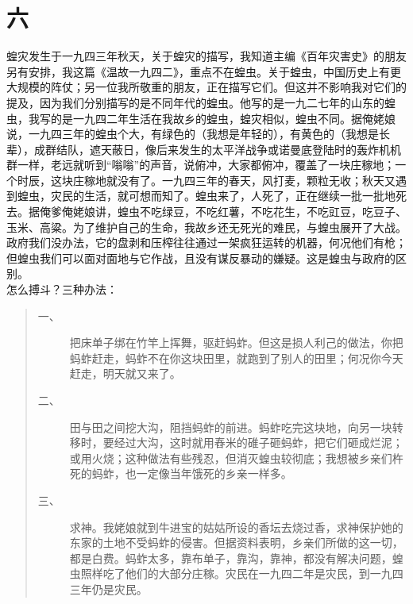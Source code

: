 \fancyhead[RO]{\thepage} %
\fancyhead[LE]{\thepage} %
\fancyfoot[LE,RO]{}
\fancyfoot[LO,CE]{}
\fancyfoot[CO,RE]{}
\chapter*{六}
蝗灾发生于一九四三年秋天，关于蝗灾的描写，我知道主编《百年灾害史》的朋友另有安排，我这篇《温故一九四二》，重点不在蝗虫。关于蝗虫，中国历史上有更大规模的阵仗；另一位我所敬重的朋友，正在描写它们。但这并不影响我对它们的提及，因为我们分别描写的是不同年代的蝗虫。他写的是一九二七年的山东的蝗虫，我写的是一九四二年生活在我故乡的蝗虫，蝗灾相似，蝗虫不同。据俺姥娘说，一九四三年的蝗虫个大，有绿色的（我想是年轻的），有黄色的（我想是长辈），成群结队，遮天蔽日，像后来发生的太平洋战争或诺曼底登陆时的轰炸机机群一样，老远就听到“嗡嗡”的声音，说俯冲，大家都俯冲，覆盖了一块庄稼地；一个时辰，这块庄稼地就没有了。一九四三年的春天，风打麦，颗粒无收；秋天又遇到蝗虫，灾民的生活，就可想而知了。蝗虫来了，人死了，正在继续一批一批地死去。据俺爹俺姥娘讲，蝗虫不吃绿豆，不吃红薯，不吃花生，不吃豇豆，吃豆子、玉米、高粱。为了维护自己的生命，我故乡还无死光的难民，与蝗虫展开了大战。政府我们没办法，它的盘剥和压榨往往通过一架疯狂运转的机器，何况他们有枪；但蝗虫我们可以面对面地与它作战，且没有谋反暴动的嫌疑。这是蝗虫与政府的区别。\\

怎么搏斗？三种办法：\\

\begin{quote}
		\begin{description}
	
		\item [一、] 把床单子绑在竹竿上挥舞，驱赶蚂蚱。但这是损人利己的做法，你把蚂蚱赶走，蚂蚱不在你这块田里，就跑到了别人的田里；何况你今天赶走，明天就又来了。\\
		
		\item [二、] 田与田之间挖大沟，阻挡蚂蚱的前进。蚂蚱吃完这块地，向另一块转移时，要经过大沟，这时就用舂米的碓子砸蚂蚱，把它们砸成烂泥；或用火烧；这种做法有些残忍，但消灭蝗虫较彻底；我想被乡亲们杵死的蚂蚱，也一定像当年饿死的乡亲一样多。\\
		
		\item [三、] 求神。我姥娘就到牛进宝的姑姑所设的香坛去烧过香，求神保护她的东家的土地不受蚂蚱的侵害。但据资料表明，乡亲们所做的这一切，都是白费。蚂蚱太多，靠布单子，靠沟，靠神，都没有解决问题，蝗虫照样吃了他们的大部分庄稼。灾民在一九四二年是灾民，到一九四三年仍是灾民。\\
	\end{description}
\end{quote}

